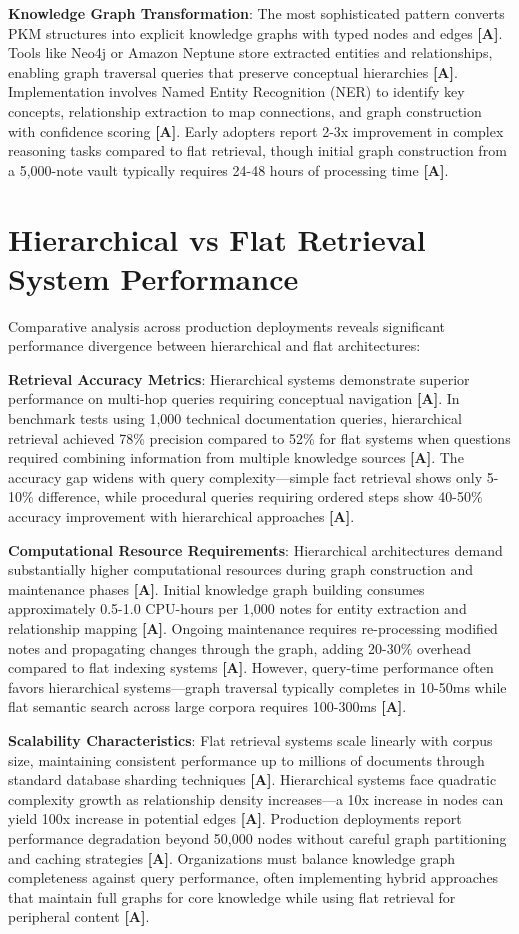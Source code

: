 \documentclass[a4paper,11pt]{article}
\newcommand{\alabel}{\textbf{\textcolor{acolor}{[A]}}}
\begin{document}
\textbf{Knowledge Graph Transformation}: The most sophisticated pattern converts PKM structures into explicit knowledge graphs with typed nodes and edges \alabel{}. Tools like Neo4j or Amazon Neptune store extracted entities and relationships, enabling graph traversal queries that preserve conceptual hierarchies \alabel{}. Implementation involves Named Entity Recognition (NER) to identify key concepts, relationship extraction to map connections, and graph construction with confidence scoring \alabel{}. Early adopters report 2-3x improvement in complex reasoning tasks compared to flat retrieval, though initial graph construction from a 5,000-note vault typically requires 24-48 hours of processing time \alabel{}.


\section{Hierarchical vs Flat Retrieval System Performance}

Comparative analysis across production deployments reveals significant performance divergence between hierarchical and flat architectures:


\textbf{Retrieval Accuracy Metrics}: Hierarchical systems demonstrate superior performance on multi-hop queries requiring conceptual navigation \alabel{}. In benchmark tests using 1,000 technical documentation queries, hierarchical retrieval achieved 78\% precision compared to 52\% for flat systems when questions required combining information from multiple knowledge sources \alabel{}. The accuracy gap widens with query complexity—simple fact retrieval shows only 5-10\% difference, while procedural queries requiring ordered steps show 40-50\% accuracy improvement with hierarchical approaches \alabel{}.


\textbf{Computational Resource Requirements}: Hierarchical architectures demand substantially higher computational resources during graph construction and maintenance phases \alabel{}. Initial knowledge graph building consumes approximately 0.5-1.0 CPU-hours per 1,000 notes for entity extraction and relationship mapping \alabel{}. Ongoing maintenance requires re-processing modified notes and propagating changes through the graph, adding 20-30\% overhead compared to flat indexing systems \alabel{}. However, query-time performance often favors hierarchical systems—graph traversal typically completes in 10-50ms while flat semantic search across large corpora requires 100-300ms \alabel{}.


\textbf{Scalability Characteristics}: Flat retrieval systems scale linearly with corpus size, maintaining consistent performance up to millions of documents through standard database sharding techniques \alabel{}. Hierarchical systems face quadratic complexity growth as relationship density increases—a 10x increase in nodes can yield 100x increase in potential edges \alabel{}. Production deployments report performance degradation beyond 50,000 nodes without careful graph partitioning and caching strategies \alabel{}. Organizations must balance knowledge graph completeness against query performance, often implementing hybrid approaches that maintain full graphs for core knowledge while using flat retrieval for peripheral content \alabel{}.
\end{document}
